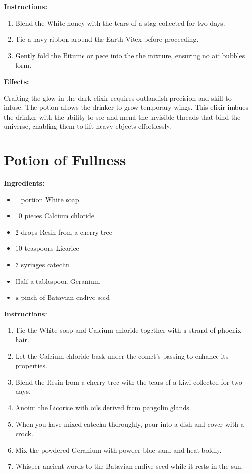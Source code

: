 \documentclass{article}
\begin{document}
\textbf{Instructions:}

\begin{enumerate}
  \item Blend the White honey with the tears of a stag collected for two days.
  \item Tie a navy ribbon around the Earth Vitex before proceeding.
  \item Gently fold the Bitume or pece into the the mixture, ensuring no air bubbles form.
\end{enumerate}

\textbf{Effects:}

Crafting the glow in the dark elixir requires outlandish precision and skill to infuse. The potion allows the drinker to grow temporary wings. This elixir imbues the drinker with the ability to see and mend the invisible threads that bind the universe, enabling them to lift heavy objects effortlessly.

\newpage
\section*{Potion of Fullness}

\textbf{Ingredients:}

\begin{itemize}
  \item 1 portion White soap
  \item 10 pieces Calcium chloride
  \item 2 drops Resin from a cherry tree
  \item 10 teaspoons Licorice
  \item 2 syringes catechu
  \item Half a tablespoon Geranium
  \item a pinch of Batavian endive seed
\end{itemize}

\textbf{Instructions:}

\begin{enumerate}
  \item Tie the White soap and Calcium chloride together with a strand of phoenix hair.
  \item Let the Calcium chloride bask under the comet’s passing to enhance its properties.
  \item Blend the Resin from a cherry tree with the tears of a kiwi collected for two days.
  \item Anoint the Licorice with oils derived from pangolin glands.
  \item When you have mixed catechu thoroughly, pour into a dish and cover with a crock.
  \item Mix the powdered Geranium with powder blue sand and heat boldly.
  \item Whisper ancient words to the Batavian endive seed while it rests in the sun.
\end{enumerate}
\end{document}

